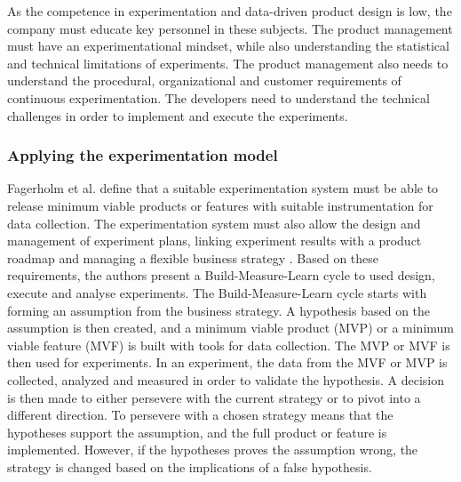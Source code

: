 \documentclass[english, grading]{tktltiki2}
\theoremstyle{definition}
\theoremstyle{remark}
\begin{document}
As the competence in experimentation and data-driven product design is low, the company must educate key personnel in these subjects. The product management must have an experimentational mindset, while also understanding the statistical and technical limitations of experiments. The product management also needs to understand the procedural, organizational and customer requirements of continuous experimentation. The developers need to understand the technical challenges in order to implement and execute the experiments.






\subsubsection{Applying the experimentation model}
Fagerholm et al. define that a suitable experimentation system must be able to release minimum viable products or features with suitable instrumentation for data collection. The experimentation system must also allow the design and management of experiment plans, linking experiment results with a product roadmap and managing a flexible business strategy \cite{fagerholm2014building}. Based on these requirements, the authors present a Build-Measure-Learn cycle to used design, execute and analyse experiments. The Build-Measure-Learn cycle starts with forming an assumption from the business strategy. A hypothesis based on the assumption is then created, and a minimum viable product (MVP) or a minimum viable feature (MVF) is built with tools for data collection. The MVP or MVF is then used for experiments. In an experiment, the data from the MVF or MVP is collected, analyzed and measured in order to validate the hypothesis. A decision is then made to either persevere with the current strategy or to pivot into a different direction. To persevere with a chosen strategy means that the hypotheses support the assumption, and the full product or feature is implemented. However, if the hypotheses proves the assumption wrong, the strategy is changed based on the implications of a false hypothesis.
\end{document}
